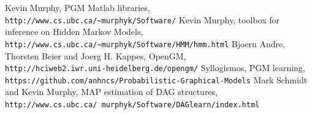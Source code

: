 \documentclass{article}
\begin{document}
    \begin{thebibliography}{5}
        Kevin Murphy, PGM Matlab libraries, \\\texttt{http://www.cs.ubc.ca/\~{}murphyk/Software/}
        Kevin Murphy, toolbox for inference on Hidden Markov Models, \\\texttt{http://www.cs.ubc.ca/\~{}murphyk/Software/HMM/hmm.html}
        Bjoern Andre, Thorsten Beier and Joerg H. Kappes, OpenGM, \\\texttt{http://hciweb2.iwr.uni-heidelberg.de/opengm/}
        Syllogismos, PGM learning, \\\texttt{https://github.com/anhncs/Probabilistic-Graphical-Models}
        Mark Schmidt and Kevin Murphy, MAP estimation  of DAG structures, \\\texttt{http://www.cs.ubc.ca/~murphyk/Software/DAGlearn/index.html}
    \end{thebibliography}
\end{document}
